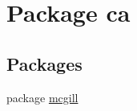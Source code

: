 \hypertarget{namespaceca}{}\section{Package ca}
\label{namespaceca}
\subsection*{Packages}
\begin{DoxyCompactItemize}
\item 
package \hyperlink{namespaceca_1_1mcgill}{mcgill}
\end{DoxyCompactItemize}
